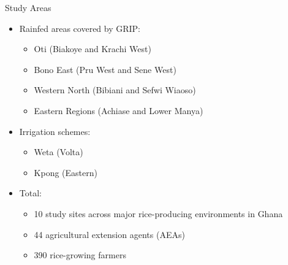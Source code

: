 \documentclass[aspectratio=169]{beamer}
\begin{document}
\begin{frame}{Study Areas}
	\begin{itemize}
		\item Rainfed areas covered by GRIP:
		\begin{itemize}
			\item Oti (Biakoye and Krachi West)
			\item Bono East (Pru West and Sene West)
			\item Western North (Bibiani and Sefwi Wiaoso)
			\item Eastern Regions (Achiase and Lower Manya) 
			\vspace{0.3cm}
		\end{itemize}
		\item Irrigation schemes:
		\begin{itemize}
			\item Weta (Volta)
			\item Kpong (Eastern)
		\end{itemize}
		\vspace{0.3cm}
		\item Total: 
		\begin{itemize}
			\item 10 study sites across major rice-producing environments in Ghana
			\item 44 agricultural extension agents (AEAs)
			\item 390 rice-growing farmers
			
		\end{itemize}
		
	\end{itemize}
\end{frame}
\end{document}
